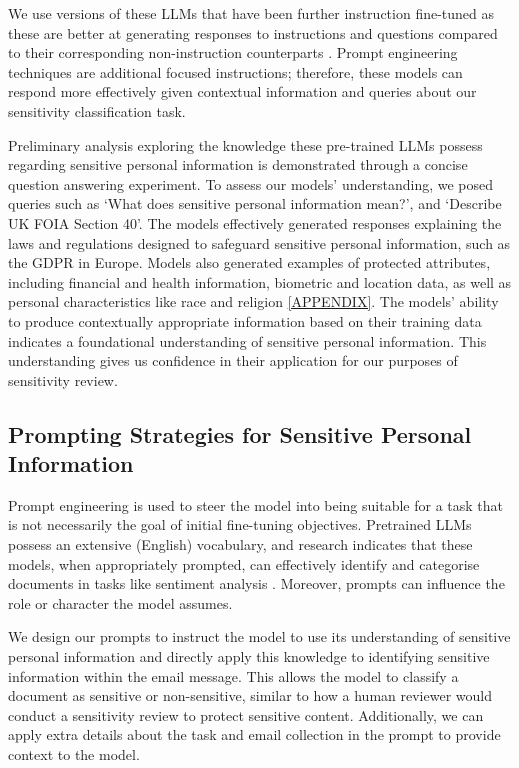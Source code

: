 We use versions of these LLMs that have been further instruction fine-tuned as these are better at generating responses to instructions and questions compared to their corresponding non-instruction counterparts \cite{wei2021finetuned}. Prompt engineering techniques are additional focused instructions; therefore, these models can respond more effectively given contextual information and queries about our sensitivity classification task.

Preliminary analysis exploring the knowledge these pre-trained LLMs possess regarding sensitive personal information is demonstrated through a concise question answering experiment. To assess our models’ understanding, we posed queries such as ‘What does sensitive personal information mean?’, and ‘Describe UK FOIA Section 40’. The models effectively generated responses explaining the laws and regulations designed to safeguard sensitive personal information, such as the GDPR in Europe. Models also generated examples of protected attributes, including financial and health information, biometric and location data, as well as personal characteristics like race and religion \ref{APPENDIX}. The models' ability to produce contextually appropriate information based on their training data indicates a foundational understanding of sensitive personal information. This understanding gives us confidence in their application for our purposes of sensitivity review.

\subsection{Prompting Strategies for Sensitive Personal Information}
Prompt engineering is used to steer the model into being suitable for a task that is not necessarily the goal of initial fine-tuning objectives. Pretrained LLMs possess an extensive (English) vocabulary, and research indicates that these models, when appropriately prompted, can effectively identify and categorise documents in tasks like sentiment analysis \cite{kocon2023chatgpt, krugmann2024sentiment}. Moreover, prompts can influence the role or character the model assumes.

We design our prompts to instruct the model to use its understanding of sensitive personal information and directly apply this knowledge to identifying sensitive information within the email message. This allows the model to classify a document as sensitive or non-sensitive, similar to how a human reviewer would conduct a sensitivity review to protect sensitive content. Additionally, we can apply extra details about the task and email collection in the prompt to provide context to the model.

